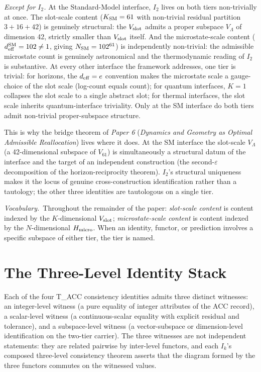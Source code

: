 \documentclass[11pt]{article}
\newcommand{\paperref}[2]{\emph{Paper #1} (\emph{#2})}
\begin{document}
\emph{Except for $I_2$.} At the Standard-Model interface, $I_2$ lives on both tiers non-trivially at once. The slot-scale content ($K_{\rm SM} = 61$ with non-trivial residual partition $3 + 16 + 42$) is genuinely structural: the $V_{\rm slot}$ admits a proper subspace $V_\Lambda$ of dimension 42, strictly smaller than $V_{\rm slot}$ itself. And the microstate-scale content ($d_{\rm eff}^{\rm SM} = 102 \neq 1$, giving $N_{\rm SM} = 102^{61}$) is independently non-trivial: the admissible microstate count is genuinely astronomical and the thermodynamic reading of $I_2$ is substantive. At every other interface the framework addresses, one tier is trivial: for horizons, the $d_{\rm eff} = e$ convention makes the microstate scale a gauge-choice of the slot scale (log-count equals count); for quantum interfaces, $K = 1$ collapses the slot scale to a single abstract slot; for thermal interfaces, the slot scale inherits quantum-interface triviality. Only at the SM interface do both tiers admit non-trivial proper-subspace structure.

This is why the bridge theorem of \paperref{6}{Dynamics and Geometry as Optimal Admissible Reallocation} lives where it does. At the SM interface the slot-scale $V_\Lambda$ (a 42-dimensional subspace of $V_{61}$) is simultaneously a structural datum of the interface and the target of an independent construction (the second-$\varepsilon$ decomposition of the horizon-reciprocity theorem). $I_2$'s structural uniqueness makes it the locus of genuine cross-construction identification rather than a tautology; the other three identities are tautologous on a single tier.

\smallskip

\noindent\emph{Vocabulary.}\ Throughout the remainder of the paper: \emph{slot-scale content} is content indexed by the $K$-dimensional $V_{\rm slot}$; \emph{microstate-scale content} is content indexed by the $N$-dimensional $H_{\rm micro}$.  When an identity, functor, or prediction involves a specific subspace of either tier, the tier is named.

\section{The Three-Level Identity Stack}\label{sec:three_level}

Each of the four T\_ACC consistency identities admits three distinct witnesses: an integer-level witness (a pure equality of integer attributes of the ACC record), a scalar-level witness (a continuous-scalar equality with explicit residual and tolerance), and a subspace-level witness (a vector-subspace or dimension-level identification on the two-tier carrier). The three witnesses are not independent statements: they are related pairwise by inter-level functors, and each $I_k$'s composed three-level consistency theorem asserts that the diagram formed by the three functors commutes on the witnessed values.
\end{document}

